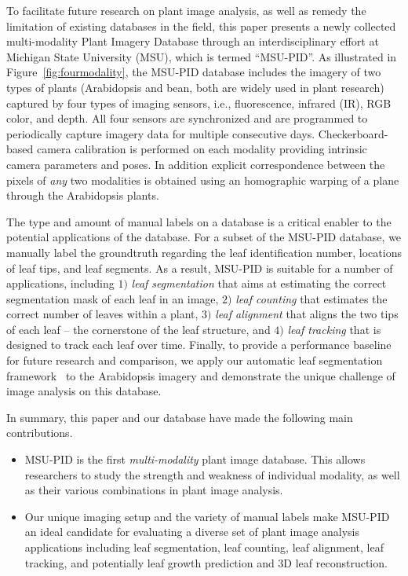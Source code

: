 To facilitate future research on plant image analysis, as well as remedy the limitation of existing databases in the field, this paper presents a newly collected multi-modality Plant Imagery Database through an interdisciplinary effort at Michigan State University (MSU), which is termed ``MSU-PID''.
As illustrated in Figure~\ref{fig:fourmodality}, the MSU-PID database includes the imagery of two types of plants (Arabidopsis and bean, both are widely used in plant research) captured by four types of imaging sensors, i.e., fluorescence, infrared (IR), RGB color, and depth.
All four sensors are synchronized and are programmed to periodically capture imagery data for multiple consecutive days.
Checkerboard-based camera calibration is performed on each modality providing intrinsic camera parameters and poses.  In addition explicit correspondence between the pixels of {\it any} two modalities is obtained using an homographic warping of a plane through the Arabidopsis plants.


The type and amount of manual labels on a database is a critical enabler to the potential applications of the database.
For a subset of the MSU-PID database, we manually label the groundtruth regarding the leaf identification number, locations of leaf tips, and leaf segments.
As a result, MSU-PID is suitable for a number of applications, including $1)$ {\it leaf segmentation} that aims at estimating the correct segmentation mask of each leaf in an image, $2)$ {\it leaf counting} that estimates the correct number of leaves within a plant, $3)$ {\it leaf alignment} that aligns the two tips of each leaf -- the cornerstone of the leaf structure, and $4)$ {\it leaf tracking} that is designed to track each leaf over time.
Finally, to provide a performance baseline for future research and comparison, we apply our automatic leaf segmentation framework~\cite{yin2014a,yin2014b} to the Arabidopsis imagery and demonstrate the unique challenge of image analysis on this database.

In summary, this paper and our database have made the following main contributions.
\begin{itemize}
\item MSU-PID is the first {\it multi-modality} plant image database. This allows researchers to study the strength and weakness of individual modality, as well as their various combinations in plant image analysis.
\item Our unique imaging setup and the variety of manual labels make MSU-PID an ideal candidate for evaluating a diverse set of plant image analysis applications including leaf segmentation, leaf counting, leaf alignment, leaf tracking, and potentially leaf growth prediction and $3$D leaf reconstruction.
\end{itemize}


